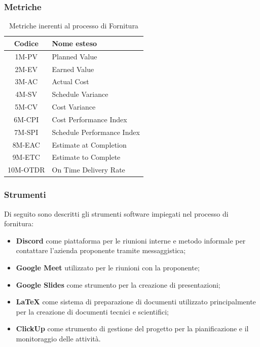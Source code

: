\subsubsection{Metriche}
\begin{table}[!h]
	\centering
	\begin{tabular}{|c|l|}
		\hline
		\textbf{Codice} & \textbf{Nome esteso}      \\
		\hline
		1M-PV 	 & Planned Value            		\\
		2M-EV 	 & Earned Value            			\\
		3M-AC 	 & Actual Cost            			\\
		4M-SV 	 & Schedule Variance            	\\
		5M-CV 	 & Cost Variance            		\\
		6M-CPI 	 & Cost Performance Index           \\
		7M-SPI 	 & Schedule Performance Index       \\
		8M-EAC 	 & Estimate at Completion           \\
		9M-ETC 	 & Estimate to Complete            	\\
		10M-OTDR & On Time Delivery Rate            \\
		\hline
	\end{tabular}
	\caption{Metriche inerenti al processo di Fornitura}
\end{table}

\subsubsection{Strumenti}
Di seguito sono descritti gli strumenti software impiegati nel processo di fornitura:
\begin{itemize}
	\item \textbf{Discord} come piattaforma per le riunioni interne e metodo informale per contattare l'azienda proponente tramite messaggistica;
	\item \textbf{Google Meet} utilizzato per le riunioni con la proponente;
	\item \textbf{Google Slides} come strumento per la creazione di presentazioni; 
	\item \textbf{LaTeX} come sistema di preparazione di documenti utilizzato principalmente per la creazione di documenti tecnici e scientifici;
	\item \textbf{ClickUp} come strumento di gestione del progetto per la pianificazione e il monitoraggio delle attività.
\end{itemize}

